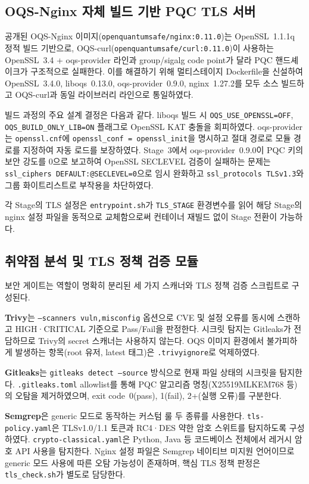 \subsection{OQS-Nginx 자체 빌드 기반 PQC TLS 서버}

공개된 OQS-Nginx 이미지(\texttt{openquantumsafe/nginx:0.11.0})는 OpenSSL~1.1.1q 정적 빌드 기반으로, OQS-curl(\texttt{openquantumsafe/curl:0.11.0})이 사용하는 OpenSSL~3.4 + oqs-provider 라인과 group/sigalg code point가 달라 PQC 핸드셰이크가 구조적으로 실패한다.
이를 해결하기 위해 멀티스테이지 Dockerfile을 신설하여 OpenSSL~3.4.0, liboqs~0.13.0, oqs-provider~0.9.0, nginx~1.27.2를 모두 소스 빌드하고 OQS-curl과 동일 라이브러리 라인으로 통일하였다.

빌드 과정의 주요 설계 결정은 다음과 같다.
liboqs 빌드 시 \texttt{OQS\_USE\_OPENSSL=OFF}, \texttt{OQS\_BUILD\_ONLY\_LIB=ON} 플래그로 OpenSSL KAT 충돌을 회피하였다.
oqs-provider는 \texttt{openssl.cnf}에 \texttt{openssl\_conf = openssl\_init}을 명시하고 절대 경로로 모듈 경로를 지정하여 자동 로드를 보장하였다.
Stage~3에서 oqs-provider~0.9.0이 PQC 키의 보안 강도를 0으로 보고하여 OpenSSL SECLEVEL 검증이 실패하는 문제는 \texttt{ssl\_ciphers DEFAULT:@SECLEVEL=0}으로 임시 완화하고 \texttt{ssl\_protocols TLSv1.3}와 그룹 화이트리스트로 부작용을 차단하였다.

각 Stage의 TLS 설정은 \texttt{entrypoint.sh}가 \texttt{TLS\_STAGE} 환경변수를 읽어 해당 Stage의 nginx 설정 파일을 동적으로 교체함으로써 컨테이너 재빌드 없이 Stage 전환이 가능하다.

\subsection{취약점 분석 및 TLS 정책 검증 모듈}

보안 게이트는 역할이 명확히 분리된 세 가지 스캐너와 TLS 정책 검증 스크립트로 구성된다.

\textbf{Trivy}는 \texttt{--scanners vuln,misconfig} 옵션으로 CVE 및 설정 오류를 동시에 스캔하고 HIGH·CRITICAL 기준으로 Pass/Fail을 판정한다.
시크릿 탐지는 Gitleaks가 전담하므로 Trivy의 secret 스캐너는 사용하지 않는다.
OQS 이미지 환경에서 불가피하게 발생하는 항목(root 유저, latest 태그)은 \texttt{.trivyignore}로 억제하였다.

\textbf{Gitleaks}는 \texttt{gitleaks detect --source} 방식으로 현재 파일 상태의 시크릿을 탐지한다.
\texttt{.gitleaks.toml} allowlist를 통해 PQC 알고리즘 명칭(X25519MLKEM768 등)의 오탐을 제거하였으며, exit code~0(pass), 1(fail), 2+(실행 오류)를 구분한다.

\textbf{Semgrep}은 generic 모드로 동작하는 커스텀 룰 두 종류를 사용한다.
\texttt{tls-policy.yaml}은 TLSv1.0/1.1 토큰과 RC4·DES 약한 암호 스위트를 탐지하도록 구성하였다.
\texttt{crypto-classical.yaml}은 Python, Java 등 코드베이스 전체에서 레거시 암호 API 사용을 탐지한다.
Nginx 설정 파일은 Semgrep 네이티브 미지원 언어이므로 generic 모드 사용에 따른 오탐 가능성이 존재하며, 핵심 TLS 정책 판정은 \texttt{tls\_check.sh}가 별도로 담당한다.

